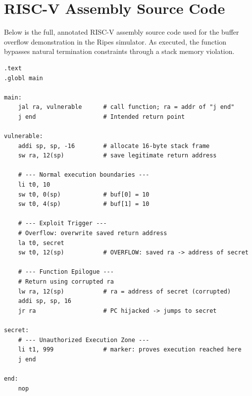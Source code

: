 \appendix
\chapter{RISC-V Assembly Source Code}

Below is the full, annotated RISC-V assembly source code used for the buffer overflow demonstration in the Ripes simulator. As executed, the function bypasses natural termination constraints through a stack memory violation.

\begin{lstlisting}[language=RISCV, caption={Complete Buffer Overflow Exploit Program}]
.text
.globl main

main:
    jal ra, vulnerable      # call function; ra = addr of "j end"
    j end                   # Intended return point

vulnerable:
    addi sp, sp, -16        # allocate 16-byte stack frame
    sw ra, 12(sp)           # save legitimate return address

    # --- Normal execution boundaries ---
    li t0, 10
    sw t0, 0(sp)            # buf[0] = 10
    sw t0, 4(sp)            # buf[1] = 10

    # --- Exploit Trigger ---
    # Overflow: overwrite saved return address
    la t0, secret
    sw t0, 12(sp)           # OVERFLOW: saved ra -> address of secret

    # --- Function Epilogue ---
    # Return using corrupted ra
    lw ra, 12(sp)           # ra = address of secret (corrupted)
    addi sp, sp, 16
    jr ra                   # PC hijacked -> jumps to secret

secret:
    # --- Unauthorized Execution Zone ---
    li t1, 999              # marker: proves execution reached here
    j end

end:
    nop
\end{lstlisting}
